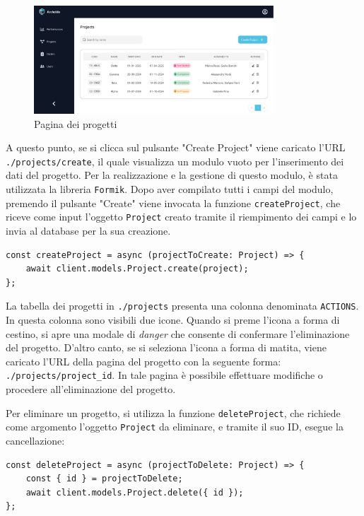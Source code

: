 \documentclass[target=bach,aauheader=,style=]{thud}
\begin{document}
\begin{figure}[H]
    \centering
    \includegraphics[width=0.8\textwidth]{img/interfacce/table_project.pdf} 
    \caption{Pagina dei progetti}
\end{figure}

\noindent A questo punto, se si clicca sul pulsante "Create Project" viene caricato l'URL \texttt{./projects/create}, il quale visualizza un modulo vuoto per l'inserimento dei dati del progetto. Per la realizzazione e la gestione di questo modulo, è stata utilizzata la libreria \texttt{Formik}. Dopo aver compilato tutti i campi del modulo, premendo il pulsante "Create" viene invocata la funzione \texttt{createProject}, che riceve come input l'oggetto \texttt{Project} creato tramite il riempimento dei campi e lo invia al database per la sua creazione.

\begin{lstlisting}[caption=funzione \texttt{createProject}]
const createProject = async (projectToCreate: Project) => {
    await client.models.Project.create(project);
};
\end{lstlisting}

\noindent La tabella dei progetti in \texttt{./projects} presenta una colonna denominata \texttt{ACTIONS}. In questa colonna sono visibili due icone. Quando si preme l'icona a forma di cestino, si apre una modale di \textit{danger} che consente di confermare l'eliminazione del progetto. D'altro canto, se si seleziona l'icona a forma di matita, viene caricato l'URL della pagina del progetto con la seguente forma: \texttt{./projects/project\_id}. In tale pagina è possibile effettuare modifiche o procedere all'eliminazione del progetto.

\noindent Per eliminare un progetto, si utilizza la funzione \texttt{deleteProject}, che richiede come argomento l'oggetto \texttt{Project} da eliminare, e tramite il suo ID, esegue la cancellazione:

\begin{lstlisting}[caption=funzione \texttt{deleteProject}]
const deleteProject = async (projectToDelete: Project) => {
    const { id } = projectToDelete;
    await client.models.Project.delete({ id });
};
\end{lstlisting}
\end{document}
